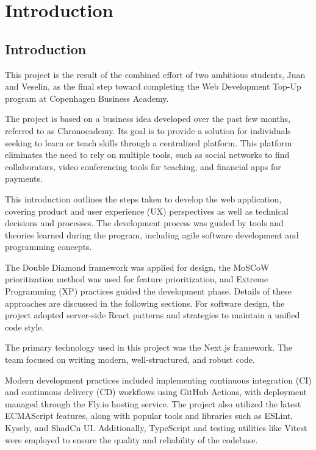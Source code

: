 \chapter{Introduction}\label{ch:introduction}

\section{Introduction}\label{sec:introduction}
This project is the result of the combined effort of two ambitious students, Juan and Veselin, as the final step toward completing the Web Development Top-Up program at Copenhagen Business Academy.

The project is based on a business idea developed over the past few months, referred to as Chronocademy.
Its goal is to provide a solution for individuals seeking to learn or teach skills through a centralized platform.
This platform eliminates the need to rely on multiple tools, such as social networks to find collaborators, video conferencing tools for teaching, and financial apps for payments.

This introduction outlines the steps taken to develop the web application, covering product and user experience (UX) perspectives as well as technical decisions and processes.
The development process was guided by tools and theories learned during the program, including agile software development and programming concepts.

The Double Diamond framework was applied for design, the MoSCoW prioritization method was used for feature prioritization, and Extreme Programming (XP) practices guided the development phase.
Details of these approaches are discussed in the following sections.
For software design, the project adopted server-side React patterns and strategies to maintain a unified code style.

The primary technology used in this project was the Next.js framework.
The team focused on writing modern, well-structured, and robust code.

Modern development practices included implementing continuous integration (CI) and continuous delivery (CD) workflows using GitHub Actions, with deployment managed through the Fly.io hosting service.
The project also utilized the latest ECMAScript features, along with popular tools and libraries such as ESLint, Kysely, and ShadCn UI. Additionally, TypeScript and testing utilities like Vitest were employed to ensure the quality and reliability of the codebase.

